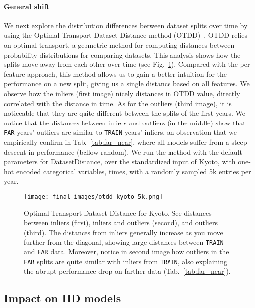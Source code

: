 \documentclass{article}
\begin{document}
    \paragraph{General shift} We next explore the distribution differences between dataset splits over time by using the Optimal Transport Dataset Distance method (OTDD)~\cite{otdd}. OTDD relies on optimal transport, a geometric method for computing distances between probability distributions for comparing datasets. This analysis shows how the splits move away from each other over time (see Fig.~\ref{fig:otdd_kyoto}). Compared with the per feature approach, this method allows us to gain a better intuition for the performance on a new split, giving us a single distance based on all features. We observe how the inliers (first image) nicely distances in OTDD value, directly correlated with the distance in time. As for the outliers (third image), it is noticeable that they are quite different between the splits of the first years. We notice that the distances between inliers and outliers (in the middle) show that \texttt{FAR} years' outliers are similar to \texttt{TRAIN} years' inliers, an observation that we empirically confirm in Tab.~\ref{tab:far_near}, where all models suffer from a steep descent in performance (bellow random). We run the method with the default parameters for DatasetDistance, over the standardized input of Kyoto, with one-hot encoded categorical variables,  times, with a randomly sampled 5k entries per year.

    \begin{figure}[t]
        \begin{center}
            \texttt{[image: final\_images/otdd\_kyoto\_5k.png]}
        \end{center}
        \caption{Optimal Transport Dataset Distance for Kyoto. See distances between inliers (first), inliers and outliers (second), and outliers (third). The distances from inliers generally increase as you move further from the diagonal, showing large distances between \texttt{TRAIN} and \texttt{FAR} data. Moreover, notice in second image how outliers in the \texttt{FAR} splits are quite similar with inliers from \texttt{TRAIN}, also explaining the abrupt performance drop on farther data (Tab.~\ref{tab:far_near}).}
        \label{fig:otdd_kyoto}
\end{figure}



\subsection{Impact on IID models}\label{sec:distrib-shift_models}
\end{document}

